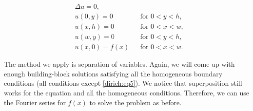 \begin{center}
\begin{minipage}[b]{2.7in}
\vspace{\fill}
\begin{align}
& \Delta u = 0 , & &  \label{dirich:eq1} \\
& u(0,y) = 0 & & \text{for }  0 < y < h,\label{dirich:eq2} \\
& u(x,h) = 0 & & \text{for }  0 < x < w,\label{dirich:eq3} \\
& u(w,y) = 0 & & \text{for }  0 < y < h,\label{dirich:eq4} \\
& u(x,0) = f(x) & & \text{for }  0 < x < w.\label{dirich:eq5}
\end{align}
\vspace{\fill}
\end{minipage}
\qquad
\qquad
\end{center}

The method we apply is separation of variables.  Again, we will
come up with enough building-block
solutions satisfying all the homogeneous boundary conditions
(all conditions except \eqref{dirich:eq5}).  We notice that superposition
still works for the equation and all the homogeneous conditions.
Therefore,
we can use the Fourier series for $f(x)$ to solve the
problem as before.

